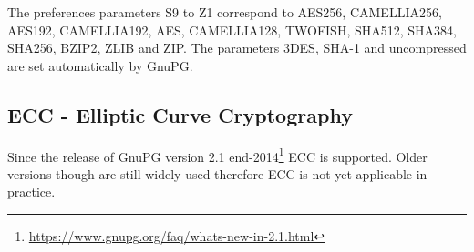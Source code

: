 

The preferences parameters S9 to Z1 correspond to AES256, CAMELLIA256, AES192, CAMELLIA192, AES, CAMELLIA128, TWOFISH,
SHA512, SHA384, SHA256, BZIP2, ZLIB and ZIP. The parameters 3DES, SHA-1 and uncompressed are set automatically by GnuPG.

\subsection{ECC - Elliptic Curve Cryptography}
Since the release of GnuPG version 2.1 end-2014\footnote{\url{https://www.gnupg.org/faq/whats-new-in-2.1.html}} ECC is supported. Older versions though are still widely used therefore ECC is not yet applicable in practice. 












